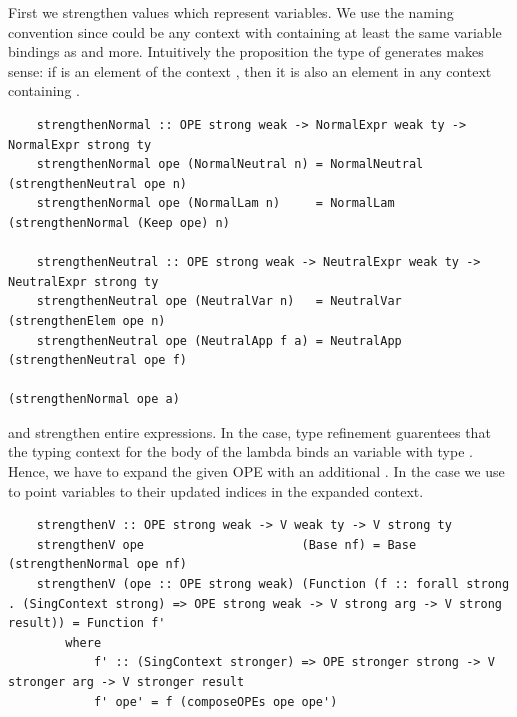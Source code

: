 
First we strengthen  values which represent variables. We use the naming convention  since  could be any context with containing at least the same variable bindings as  and more. 
Intuitively the proposition the type of  generates makes sense: if  is an element of the context , then it is also an element in any context  containing .


\begin{lstlisting} 
    strengthenNormal :: OPE strong weak -> NormalExpr weak ty -> NormalExpr strong ty
    strengthenNormal ope (NormalNeutral n) = NormalNeutral (strengthenNeutral ope n)
    strengthenNormal ope (NormalLam n)     = NormalLam (strengthenNormal (Keep ope) n)

    strengthenNeutral :: OPE strong weak -> NeutralExpr weak ty -> NeutralExpr strong ty
    strengthenNeutral ope (NeutralVar n)   = NeutralVar (strengthenElem ope n)
    strengthenNeutral ope (NeutralApp f a) = NeutralApp (strengthenNeutral ope f) 
                                                        (strengthenNormal ope a) 

\end{lstlisting}

 and  strengthen entire expressions. In the  case, type refinement guarentees that the typing context for the body of the lambda binds an variable with type . Hence, we have to expand the given OPE with an additional . In the  case we use  to point variables to their updated indices in the expanded context.

\begin{lstlisting}
    strengthenV :: OPE strong weak -> V weak ty -> V strong ty
    strengthenV ope                      (Base nf) = Base (strengthenNormal ope nf)
    strengthenV (ope :: OPE strong weak) (Function (f :: forall strong . (SingContext strong) => OPE strong weak -> V strong arg -> V strong result)) = Function f' 
        where
            f' :: (SingContext stronger) => OPE stronger strong -> V stronger arg -> V stronger result
            f' ope' = f (composeOPEs ope ope')
\end{lstlisting}

